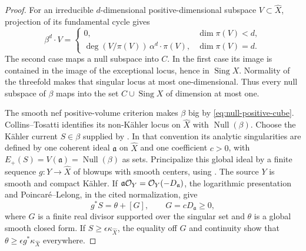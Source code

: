 \begin{proof}
For an irreducible \(d\)-dimensional positive-dimensional subspace
\(V\subset\widehat X\), projection of its fundamental cycle gives
\begin{equation}\label{eq:null-cycle-projection}
 \beta^d\cdot V=
 \begin{cases}
  0,&\dim\pi(V)<d,\\
  \deg(V/\pi(V))\,\alpha^d\cdot\pi(V),&\dim\pi(V)=d.
 \end{cases}
\end{equation}
The second case maps a null subspace into \(C\).  In the first case its
image is contained in the image of the exceptional locus, hence in
\(\operatorname{Sing}X\).  Normality of the threefold makes that singular
locus at most one-dimensional.  Thus every null subspace of \(\beta\)
maps into the set \(C\cup\operatorname{Sing}X\) of dimension at most one.

The smooth nef positive-volume criterion
\cite[Lemma~2.35]{DasHaconPaun2024} makes \(\beta\) big by
\eqref{eq:null-positive-cube}.  Collins--Tosatti
\cite[Theorem~1.1]{CollinsTosatti2015} identifies its non-K\"ahler locus
on \(\widehat X\) with \(\operatorname{Null}(\beta)\).  Choose the K\"ahler current
\(S\in\beta\) supplied by
\cite[Section~2.5.1 and Theorem~3.17(ii)]{Boucksom2004}.  In that
convention its analytic singularities are defined by one coherent ideal
\(\mathfrak a\) on \(\widehat X\) and one coefficient \(c>0\), with
\(E_+(S)=V(\mathfrak a)=\operatorname{Null}(\beta)\) as sets.
Principalize this global ideal by
a finite sequence \(g:Y\to\widehat X\) of blowups with smooth centers,
using \cite[Remark~2.14]{DasHaconPaun2024}.  The source \(Y\) is smooth
and compact K\"ahler.  If
\(\mathfrak a\mathcal O_Y=\mathcal O_Y(-D_{\mathfrak a})\), the logarithmic
presentation and Poincaré--Lelong, in the cited normalization, give
\[
 g^*S=\theta+[G],\qquad G=cD_{\mathfrak a}\geq0,
\]
where \(G\) is a finite real divisor supported over the singular set and
\(\theta\) is a global smooth closed form.
If \(S\geq\epsilon\kappa_{\widehat X}\), the equality off \(G\) and
continuity show that \(\theta\geq\epsilon g^*\kappa_{\widehat X}\)
everywhere.


\end{proof}
